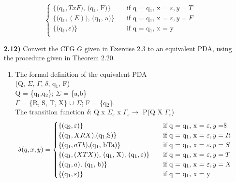 \documentclass[12pt]{letter}
\begin{document}
\begin{enumerate}
\[\begin{cases}
	\text{\{(q$_{1}, TxF$), (q$_{1}$, F)\}} 
	&\quad\text{if q = q$_{1}$, x = $\varepsilon$}, y = T \\
	
	\text{\{(q$_{1}, (E)$), (q$_{1}$, a)\}} 
	&\quad\text{if q = q$_{1}$, x = $\varepsilon$}, y = F \\
	
	\text{\{(q$_{1}, \varepsilon$)\}} 
	&\quad\text{if q = q$_{1}$, x = y}\\ 
	\end{cases}
	\]	

\item[\textbf{2.12)}] Convert the CFG $G$ given in Exercise 2.3 to an equivalent PDA, using the procedure given in Theorem 2.20.\\
\begin{enumerate}
	\item The formal definition of the equivalent PDA\\
	(Q, $\Sigma$, $\Gamma$, $\delta$, q$_{1}$, F)\\
	Q = \{q$_{1}$,q$_{2}$\}; $\Sigma$ = \{a,b\}\\$\Gamma$ = \{R, S, T, X\} $\cup$ $\Sigma$; F = \{q$_{2}$\}.\\
	The transition function $\delta$: Q x $\Sigma _{\varepsilon}$ x $\Gamma_{\varepsilon} \longrightarrow$ P(Q X $\Gamma_{\varepsilon}$)\\
	\[ \delta(q,x,y) = 
	\begin{cases}
	\text{\{(q$_{2},\varepsilon$)\}} 
	&\quad\text{if q = q$_{1}$, x = $\varepsilon$}, y =  $\textdollar$ \\
	
	\text{\{(q$_{1},XRX$),(q$_{1}$,S)\}} 
	&\quad\text{if q = q$_{1}$, x = $\varepsilon$}, y = R \\
	
	\text{\{(q$_{1},aTb$),(q$_{1}$, bTa)\}} 
	&\quad\text{if q = q$_{1}$, x = $\varepsilon$}, y = S \\
	
	\text{\{(q$_{1},(XTX)$), (q$_{1}$, X), (q$_{1}, \varepsilon$)\}} 
	&\quad\text{if q = q$_{1}$, x = $\varepsilon$}, y = T \\
	
	\text{\{(q$_{1}, a$), (q$_{1}$, b)\}} 
	&\quad\text{if q = q$_{1}$, x = $\varepsilon$}, y = X \\
	
	\text{\{(q$_{1},\varepsilon$)\}} 
	&\quad\text{if q = q$_{1}$, x = y}\\ 
	\end{cases}
	\]	
\end{enumerate}


\end{enumerate}
\end{document}
